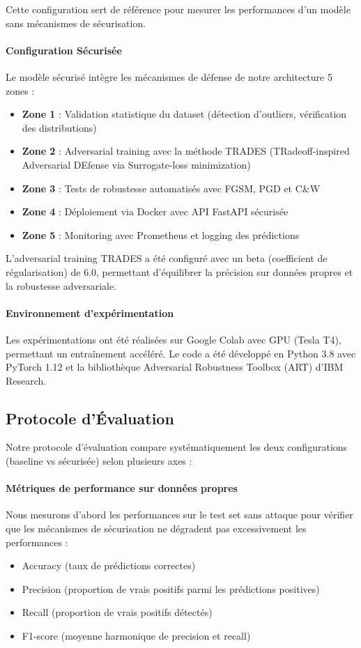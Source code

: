 Cette configuration sert de référence pour mesurer les performances d'un modèle sans mécanismes de sécurisation.

\paragraph{Configuration Sécurisée}
Le modèle sécurisé intègre les mécanismes de défense de notre architecture 5 zones :
\begin{itemize}
    \item \textbf{Zone 1} : Validation statistique du dataset (détection d'outliers, vérification des distributions)
    \item \textbf{Zone 2} : Adversarial training avec la méthode TRADES (TRadeoff-inspired Adversarial DEfense via Surrogate-loss minimization)
    \item \textbf{Zone 3} : Tests de robustesse automatisés avec FGSM, PGD et C\&W
    \item \textbf{Zone 4} : Déploiement via Docker avec API FastAPI sécurisée
    \item \textbf{Zone 5} : Monitoring avec Prometheus et logging des prédictions
\end{itemize}

L'adversarial training TRADES a été configuré avec un beta (coefficient de régularisation) de 6.0, permettant d'équilibrer la précision sur données propres et la robustesse adversariale.

\paragraph{Environnement d'expérimentation}
Les expérimentations ont été réalisées sur Google Colab avec GPU (Tesla T4), permettant un entraînement accéléré. Le code a été développé en Python 3.8 avec PyTorch 1.12 et la bibliothèque Adversarial Robustness Toolbox (ART) d'IBM Research.

\subsection{Protocole d'Évaluation}

Notre protocole d'évaluation compare systématiquement les deux configurations (baseline vs sécurisée) selon plusieurs axes :

\paragraph{Métriques de performance sur données propres}
Nous mesurons d'abord les performances sur le test set sans attaque pour vérifier que les mécanismes de sécurisation ne dégradent pas excessivement les performances :
\begin{itemize}
    \item Accuracy (taux de prédictions correctes)
    \item Precision (proportion de vrais positifs parmi les prédictions positives)
    \item Recall (proportion de vrais positifs détectés)
    \item F1-score (moyenne harmonique de precision et recall)
\end{itemize}

